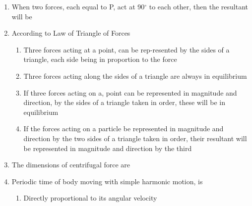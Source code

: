 \documentclass[11pt,a4paper]{article}
\begin{document}
\begin{enumerate}
\item{When two forces, each equal to P, act at 90$^\circ$ to each other, then the resultant will be
}
\\
\item{According to Law of Triangle of Forces}
\begin{enumerate}[label=\Alph*.]
\item{Three forces acting at a point, can be rep-resented by the sides of a triangle, each side being in proportion to the force}
\item{Three forces acting along the sides of a triangle are always in equilibrium}
\item{If three forces acting on a, point can be represented in magnitude and direction, by the sides of a triangle taken in order, these will be in equilibrium}
\item{If the forces acting on a particle be represented in magnitude and direction by the two sides of a triangle taken in order, their resultant will be represented in magnitude and direction by the third }
\end{enumerate}
\item{The dimensions of centrifugal force are}
\\
\item{Periodic time of body moving with simple harmonic motion, is}
\begin{enumerate}[label=\Alph*.]
\item{Directly proportional to its angular velocity}

\end{enumerate}
\end{enumerate}
\end{document}
